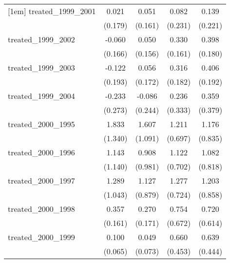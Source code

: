 {\begin{tabular}{l*{4}{c}}
[1em]
treated\_1999\_2001&       0.021         &       0.051         &       0.082         &       0.139         \\
            &     (0.179)         &     (0.161)         &     (0.231)         &     (0.221)         \\
[1em]
treated\_1999\_2002&      -0.060         &       0.050         &       0.330\sym{*}  &       0.398\sym{*}  \\
            &     (0.166)         &     (0.156)         &     (0.161)         &     (0.180)         \\
[1em]
treated\_1999\_2003&      -0.122         &       0.056         &       0.316         &       0.406\sym{*}  \\
            &     (0.193)         &     (0.172)         &     (0.182)         &     (0.192)         \\
[1em]
treated\_1999\_2004&      -0.233         &      -0.086         &       0.236         &       0.359         \\
            &     (0.273)         &     (0.244)         &     (0.333)         &     (0.379)         \\
[1em]
treated\_2000\_1995&       1.833         &       1.607         &       1.211         &       1.176         \\
            &     (1.340)         &     (1.091)         &     (0.697)         &     (0.835)         \\
[1em]
treated\_2000\_1996&       1.143         &       0.908         &       1.122         &       1.082         \\
            &     (1.140)         &     (0.981)         &     (0.702)         &     (0.818)         \\
[1em]
treated\_2000\_1997&       1.289         &       1.127         &       1.277         &       1.203         \\
            &     (1.043)         &     (0.879)         &     (0.724)         &     (0.858)         \\
[1em]
treated\_2000\_1998&       0.357\sym{*}  &       0.270         &       0.754         &       0.720         \\
            &     (0.161)         &     (0.171)         &     (0.672)         &     (0.614)         \\
[1em]
treated\_2000\_1999&       0.100         &       0.049         &       0.660         &       0.639         \\
            &     (0.065)         &     (0.073)         &     (0.453)         &     (0.444)         \\

\end{tabular}}
